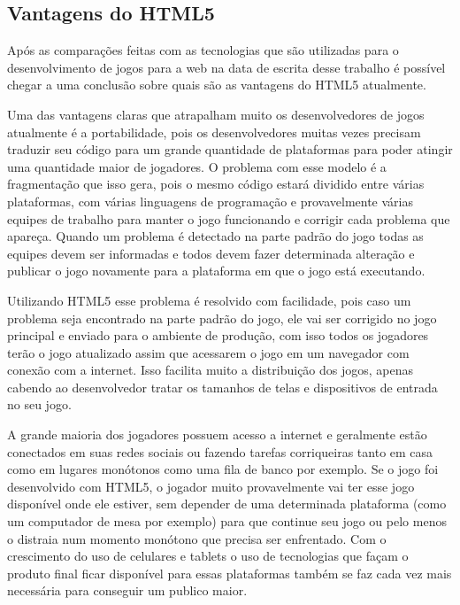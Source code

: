 \subsection{Vantagens do HTML5}
Após as comparações feitas com as tecnologias que são utilizadas para
o desenvolvimento de jogos para a web na data de escrita desse
trabalho é possível chegar a uma conclusão sobre quais são
as vantagens do HTML5 atualmente.

Uma das vantagens claras que atrapalham muito os desenvolvedores de
jogos atualmente é a portabilidade, pois os desenvolvedores muitas
vezes precisam traduzir seu código para um grande quantidade de
plataformas para poder atingir uma quantidade maior de jogadores. O
problema com esse modelo é a fragmentação que isso gera, pois o mesmo
código estará dividido entre várias plataformas, com várias linguagens
de programação e provavelmente várias equipes de trabalho para manter
o jogo funcionando e corrigir cada problema que apareça. Quando um
problema é detectado na parte padrão do jogo todas as equipes devem
ser informadas e todos devem fazer determinada alteração e publicar o
jogo novamente para a plataforma em que o jogo está executando.

Utilizando HTML5 esse problema é resolvido com facilidade, pois caso
um problema seja encontrado na parte padrão do jogo, ele vai ser
corrigido no jogo principal e enviado para o ambiente de produção, com
isso todos os jogadores terão o jogo atualizado assim que acessarem o
jogo em um navegador com conexão com a internet. Isso facilita muito a
distribuição dos jogos, apenas cabendo ao desenvolvedor tratar os
tamanhos de telas e dispositivos de entrada no seu jogo.

A grande maioria dos jogadores possuem acesso a internet e geralmente
estão conectados em suas redes sociais ou fazendo tarefas corriqueiras
tanto em casa como em lugares monótonos como uma fila de banco por
exemplo. Se o jogo foi desenvolvido com HTML5, o jogador muito
provavelmente vai ter esse jogo disponível onde ele estiver, sem
depender de uma determinada plataforma (como um computador de mesa por
exemplo) para que continue seu jogo ou pelo menos o distraia num
momento monótono que precisa ser enfrentado. Com o crescimento do uso
de celulares e tablets o uso de tecnologias que façam o produto final
ficar disponível para essas plataformas também se faz cada vez mais
necessária para conseguir um publico maior.

